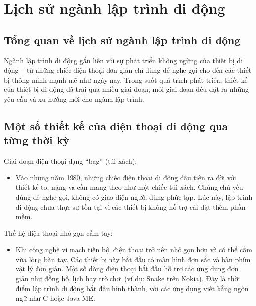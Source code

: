 \section{Lịch sử ngành lập trình di động}

\subsection{Tổng quan về lịch sử ngành lập trình di động}
\renewcommand{\labelitemi}{--}    
\begin{flushleft}
    \hspace*{0.8cm}Ngành lập trình di động gắn liền với sự phát triển không ngừng của thiết bị di động – từ những chiếc điện thoại đơn giản chỉ dùng để nghe gọi cho đến các thiết bị thông minh mạnh mẽ như ngày nay. Trong suốt quá trình phát triển, thiết kế của thiết bị di động đã trải qua nhiều giai đoạn, mỗi giai đoạn đều đặt ra những yêu cầu và xu hướng mới cho ngành lập trình.
\end{flushleft}

\subsection{Một số thiết kế của điện thoại di động qua từng thời kỳ}
\renewcommand{\labelitemi}{--}    
    \begin{flushleft}
        \hspace*{0.8cm}Giai đoạn điện thoại dạng “bag” (túi xách):
        \setlength{\leftmargini}{1.5cm}
        \begin{itemize}
            \item Vào những năm 1980, những chiếc điện thoại di động đầu tiên ra đời với thiết kế to, nặng và cần mang theo như một chiếc túi xách. Chúng chủ yếu dùng để nghe gọi, không có giao diện người dùng phức tạp. Lúc này, lập trình di động chưa thực sự tồn tại vì các thiết bị không hỗ trợ cài đặt thêm phần mềm.
        \end{itemize}
    \end{flushleft}

    \begin{flushleft}
      \hspace*{0.8cm}Thế hệ điện thoại nhỏ gọn cầm tay:
      \setlength{\leftmargini}{1.5cm}
      \begin{itemize}
          \item Khi công nghệ vi mạch tiến bộ, điện thoại trở nên nhỏ gọn hơn và có thể cầm vừa lòng bàn tay. Các thiết bị này bắt đầu có màn hình đơn sắc và bàn phím vật lý đơn giản. Một số dòng điện thoại bắt đầu hỗ trợ các ứng dụng đơn giản như đồng hồ, lịch hay trò chơi (ví dụ: Snake trên Nokia). Đây là thời điểm lập trình di động bắt đầu hình thành, với các ứng dụng viết bằng ngôn ngữ như C hoặc Java ME.
      \end{itemize}
  \end{flushleft}

